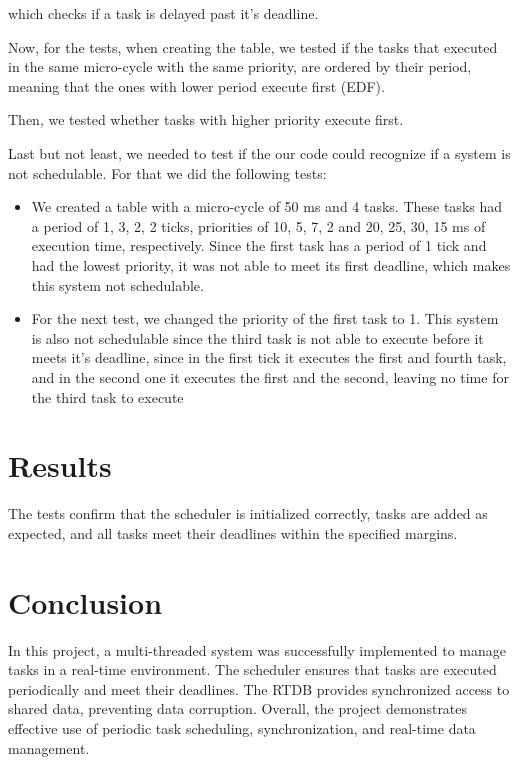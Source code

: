 \documentclass[a4paper,12pt]{article}
\begin{document}
which checks if a task is delayed past it's deadline.

Now, for the tests, when creating the table, we tested if the tasks that executed in the same micro-cycle with the same priority, are ordered by their period, meaning that the ones with lower period execute first (EDF).

Then, we tested whether tasks with higher priority execute first.

Last but not least, we needed to test if the our code could recognize if a system is not schedulable. For that we did the following tests:
\begin{itemize}
    \item We created a table with a micro-cycle of 50 ms and 4 tasks. These tasks had a period of 1, 3, 2, 2 ticks, priorities of 10, 5, 7, 2 and 20, 25, 30, 15 ms of execution time, respectively. Since the first task has a period of 1 tick and had the lowest priority, it was not able to meet its first deadline, which makes this system not schedulable.

    \item For the next test, we changed the priority of the first task to 1. This system is also not schedulable since the third task is not able to execute before it meets it's deadline, since in the first tick it executes the first and fourth task, and in the second one it executes the first and the second, leaving no time for the third task to execute


\end{itemize}
\section{Results}
The tests confirm that the scheduler is initialized correctly, tasks are added as expected, and all tasks meet their deadlines within the specified margins.

\section{Conclusion}
In this project, a multi-threaded system was successfully implemented to manage tasks in a real-time environment. The scheduler ensures that tasks are executed periodically and meet their deadlines. The RTDB provides synchronized access to shared data, preventing data corruption. Overall, the project demonstrates effective use of periodic task scheduling, synchronization, and real-time data management.
\end{document}
